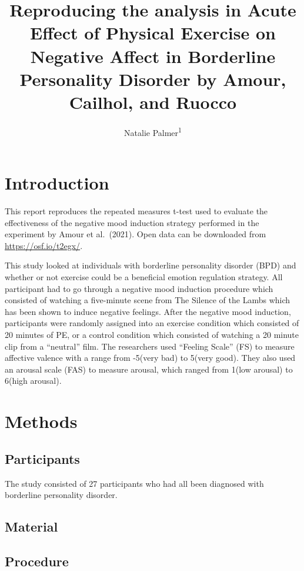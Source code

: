 \documentclass[
  english,
  man]{apa6}
\title{Reproducing the analysis in Acute Effect of Physical Exercise on Negative Affect in Borderline Personality Disorder by Amour, Cailhol, and Ruocco}
\author{Natalie Palmer\textsuperscript{1}}
\date{}
\affiliation{\vspace{0.5cm}\textsuperscript{1} Brooklyn College of the City University of New York}
\begin{document}
\maketitle

\hypertarget{introduction}{%
\section{Introduction}\label{introduction}}

This report reproduces the repeated measures t-test used to evaluate the effectiveness of the negative mood induction strategy performed in the experiment by Amour et al.~(2021). Open data can be downloaded from \url{https://osf.io/t2egx/}.

This study looked at individuals with borderline personality disorder (BPD) and whether or not exercise could be a beneficial emotion regulation strategy. All participant had to go through a negative mood induction procedure which consisted of watching a five-minute scene from The Silence of the Lambs which has been shown to induce negative feelings. After the negative mood induction, participants were randomly assigned into an exercise condition which consisted of 20 minutes of PE, or a control condition which consisted of watching a 20 minute clip from a ``neutral'' film. The researchers used ``Feeling Scale'' (FS) to measure affective valence with a range from -5(very bad) to 5(very good). They also used an arousal scale (FAS) to measure arousal, which ranged from 1(low arousal) to 6(high arousal).

\hypertarget{methods}{%
\section{Methods}\label{methods}}

\hypertarget{participants}{%
\subsection{Participants}\label{participants}}

The study consisted of 27 participants who had all been diagnosed with borderline personality disorder.

\hypertarget{material}{%
\subsection{Material}\label{material}}

\hypertarget{procedure}{%
\subsection{Procedure}\label{procedure}}
\end{document}
